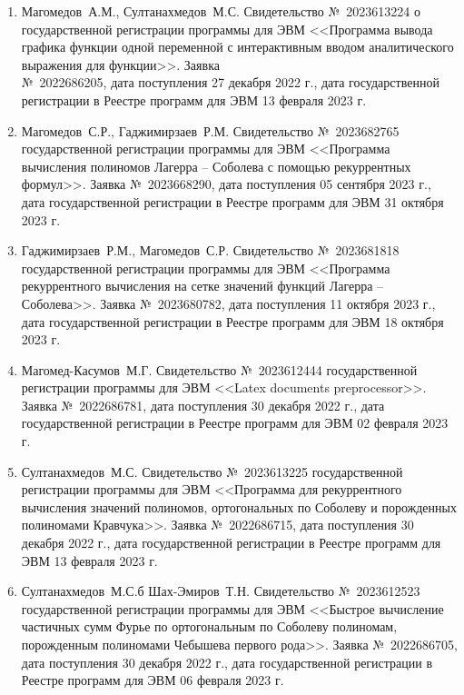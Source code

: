 \begin{enumerate}

    \item Магомедов~А.М., Султанахмедов~М.С. Свидетельство №~2023613224 о государственной регистрации программы для ЭВМ <<Программа вывода графика функции одной переменной с интерактивным вводом аналитического выражения для функции>>. Заявка \\№~2022686205, дата поступления 27 декабря 2022 г., дата государственной регистрации в Реестре программ для ЭВМ 13 февраля 2023 г.  
    
    \item
    {Магомедов~С.Р., Гаджимирзаев~Р.М.} 
    Свидетельство №~2023682765 государственной регистрации программы для ЭВМ <<Программа вычисления полиномов Лагерра -- Соболева с помощью рекуррентных формул>>. Заявка №~2023668290, дата поступления 05 сентября 2023 г., дата государственной регистрации в Реестре программ для ЭВМ 31 октября 2023 г.

    \item
    {Гаджимирзаев~Р.М., Магомедов~С.Р.} 
    Свидетельство №~2023681818 государственной регистрации программы для ЭВМ <<Программа рекуррентного вычисления на сетке значений функций Лагерра -- Соболева>>. Заявка №~2023680782, дата поступления 11 октября 2023 г., дата государственной регистрации в Реестре программ для ЭВМ 18 октября 2023 г.

    \item
    {Магомед-Касумов~М.Г.}
    Свидетельство №~2023612444 государственной регистрации программы для ЭВМ <<Latex documents preprocessor>>. Заявка №~2022686781, дата поступления 30 декабря 2022 г., дата государственной регистрации в Реестре программ для ЭВМ 02 февраля 2023 г.

    \item
    {Султанахмедов~М.С.}
    Свидетельство №~2023613225 государственной регистрации программы для ЭВМ <<Программа для рекуррентного вычисления значений полиномов, ортогональных по Соболеву и порожденных полиномами Кравчука>>. Заявка №~2022686715, дата поступления 30 декабря 2022 г., дата государственной регистрации в Реестре программ для ЭВМ 13 февраля 2023 г.

    \item
    {Султанахмедов~М.С.б Шах-Эмиров~Т.Н.}
    Свидетельство №~2023612523 государственной регистрации программы для ЭВМ <<Быстрое вычисление частичных сумм Фурье по ортогональным по Соболеву полиномам, порожденным полиномами Чебышева первого рода>>. Заявка №~2022686705, дата поступления 30 декабря 2022 г., дата государственной регистрации в Реестре программ для ЭВМ 06 февраля 2023 г.

\end{enumerate}
